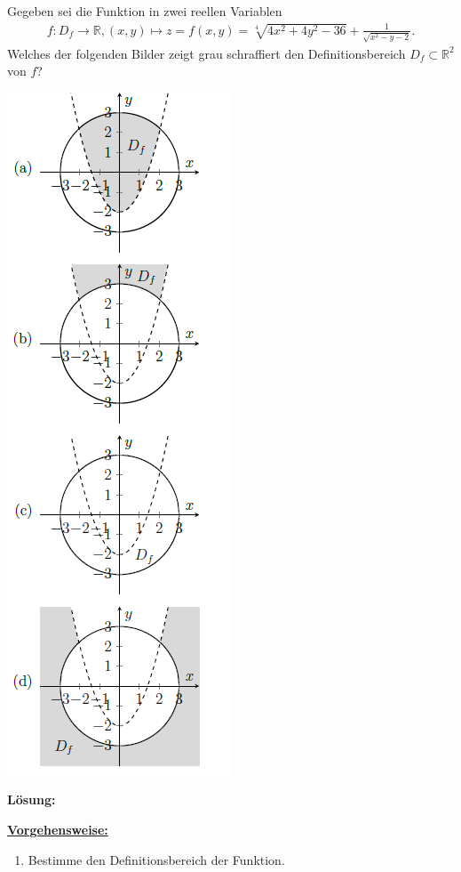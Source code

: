 \subsection*{}
Gegeben sei die Funktion in zwei reellen Variablen
\begin{align*}
f : D_f \to \mathbb{R}, (x,y) \mapsto
z = f(x,y) = \sqrt[4]{4x^2 + 4 y^2 - 36}
+ \frac{1}{\sqrt{x^2 - y -2}}.
\end{align*}
Welches der folgenden Bilder zeigt grau schraffiert den Definitionsbereich $ D_f \subset \mathbb{R}^2 $ von $ f $?
\renewcommand{\labelenumi}{(\alph{enumi})}
\begin{center}
	\includegraphics{pictures/auf3_4}
\end{center}
\newpage
\textbf{Lösung:}
\begin{mdframed}
\underline{\textbf{Vorgehensweise:}}
\renewcommand{\labelenumi}{\theenumi.}
\begin{enumerate}
\item Bestimme den Definitionsbereich der Funktion.
\end{enumerate}
\end{mdframed}

